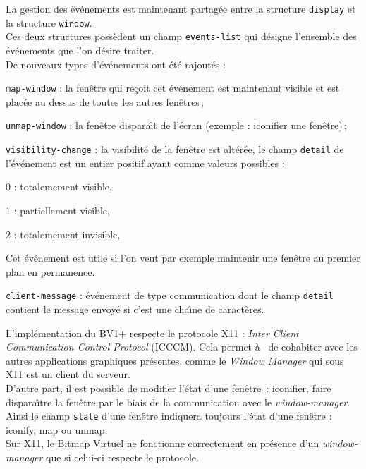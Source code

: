 La gestion des \'{e}v\'{e}nements est maintenant partag\'{e}e entre la structure
{\tt display} et la structure {\tt window}.\\
Ces deux structures poss\`{e}dent un champ {\tt events-list} qui d\'{e}signe
l'ensemble des \'{e}v\'{e}nements que l'on d\'{e}sire traiter.\\
De nouveaux types d'\'{e}v\'{e}nements ont \'{e}t\'{e} rajout\'{e}s :
\begin {Itemize}
\item {\tt map-window} : la fen\^{e}tre qui re\c{c}oit cet \'{e}v\'{e}nement est maintenant
visible et est plac\'{e}e au dessus de toutes les autres fen\^{e}tres\,;
\item {\tt unmap-window} : la fen\^{e}tre dispara\^{\i}t de l'\'{e}cran (exemple :
iconifier une fen\^{e}tre)\,;
\item {\tt visibility-change} : la visibilit\'{e} de la fen\^{e}tre est alt\'{e}r\'{e}e,
le champ {\tt detail} de l'\'{e}v\'{e}nement est un entier positif ayant
comme valeurs possibles :
\begin {Itemize}
\item 0 : totalemement visible,
\item 1 : partiellement visible,
\item 2 : totalemement invisible,
\end {Itemize}
Cet \'{e}v\'{e}nement est utile si l'on veut par exemple maintenir une fen\^{e}tre au
premier plan en permanence.
\item {\tt client-message} : \'{e}v\'{e}nement de type communication dont le champ
{\tt detail} contient le message envoy\'{e} si c'est une cha\^{\i}ne de caract\`{e}res.
\end {Itemize}



L'impl\'{e}mentation du BV1+ respecte le protocole X11 : {\em Inter Client
Communication Control Protocol} (ICCCM). Cela permet \`{a}
\LeLisp\ de cohabiter avec les autres applications graphiques pr\'{e}sentes,
comme le {\em Window Manager} qui sous X11 est un client du serveur.\\
D'autre part, il est possible de  modifier l'\'{e}tat d'une fen\^{e}tre \,:
iconifier, faire dispara\^{\i}tre la fen\^{e}tre par le biais de la communication
avec le {\em window-manager}.\\
Ainsi le champ {\tt state} d'une fen\^{e}tre indiquera toujours l'\'{e}tat d'une
fen\^{e}tre : iconify, map ou unmap.\\
Sur X11, le Bitmap Virtuel ne fonctionne correctement en pr\'{e}sence d'un
{\em window-manager} que si celui-ci respecte le protocole.




